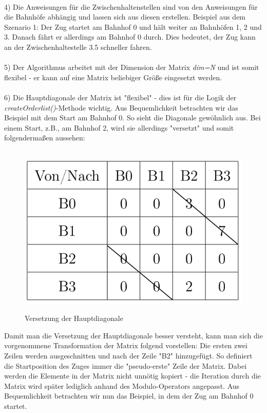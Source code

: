 \\
4) Die Anweisungen für die Zwischenhaltenstellen sind von den Anweisungen für die Bahnhöfe abhängig und lassen sich aus diesen erstellen. Beispiel aus dem Szenario 1: Der Zug startet am Bahnhof 0 und hält weiter an Bahnhöfen 1, 2 und 3. Danach fährt er allerdings am Bahnhof 0 durch. Dies bedeutet, der Zug kann an der Zwischenhaltestelle 3.5 schneller fahren.\\
\\
5) Der Algorithmus arbeitet mit der Dimension der Matrix \textit{dim=N} und ist somit flexibel - er kann auf eine Matrix beliebiger Größe eingesetzt werden.\\
\\
6) Die Hauptdiagonale der Matrix ist "flexibel" - dies ist für die Logik der \textit{createOrderlist()}-Methode wichtig. Aus Bequemlichkeit betrachten wir das Beispiel mit dem Start am Bahnhof 0. So sieht die Diagonale gewöhnlich aus. Bei einem Start, z.B., am Bahnhof 2, wird sie allerdings "versetzt" und somit folgendermaßen aussehen:\\
\\
\begin{figure}[H]	
\caption{Versetzung der Hauptdiagonale}
\center
\includegraphics[width=2\textwidth, width=270pt]{content/images/matrix2.png}
\label{pic:DiagonaleVersetzt}
\end{figure}
\noindent
Damit man die Versetzung der Hauptdiagonale besser versteht, kann man sich die vorgenommene Transformation der Matrix folgend vorstellen: Die ersten zwei Zeilen werden ausgeschnitten und nach der Zeile "B2" hinzugefügt. So definiert die Startposition des Zuges immer die "pseudo-erste" Zeile der Matrix. Dabei werden die Elemente in der Matrix nicht unnötig kopiert - die Iteration durch die Matrix wird später lediglich anhand des Modulo-Operators angepasst. Aus Bequemlichkeit betrachten wir nun das Beispiel, in dem der Zug am Bahnhof 0 startet.\\
